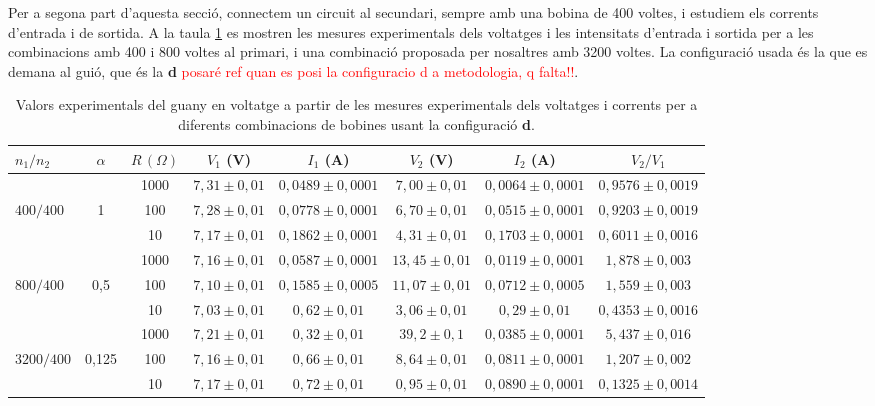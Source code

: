 \documentclass[a4paper,10.5pt]{report}
\begin{document}
Per a segona part d'aquesta secció, connectem un circuit al secundari, sempre amb una bobina de 400 voltes, i estudiem els corrents d’entrada i de sortida. A la taula \ref{tab:4.4} es mostren les mesures experimentals dels voltatges i les intensitats d'entrada i sortida per a les combinacions amb 400 i 800 voltes al primari, i una combinació proposada per nosaltres amb 3200 voltes. La configuració usada és la que es demana al guió, que és la \textbf{d} \textcolor{red}{posaré ref quan es posi la configuracio d a metodologia, q falta!!}. 

\begin{table}[H]
	\centering
	\renewcommand{\arraystretch}{1.2}
	\caption{Valors experimentals del guany en voltatge a partir de les mesures experimentals dels voltatges i corrents per a diferents combinacions de bobines usant la configuració \textbf{d}.}
	\begin{tabular}{lccccccc}
		\toprule
		$n_1/n_2$ & $\alpha$ & $R\,(\Omega)$ & $V_1$ (V) & $I_1$ (A) & $V_2$ (V) & $I_2$ (A) & $V_2/V_1$ \\
		\midrule
		& & 1000 & $7{,}31 \pm 0{,}01$ & $0{,}0489 \pm 0{,}0001$ & $7{,}00 \pm 0{,}01$ & $0{,}0064 \pm 0{,}0001$ & $0{,}9576 \pm 0{,}0019$ \\
		$400/400$ & 1 & 100  & $7{,}28 \pm 0{,}01$ & $0{,}0778 \pm 0{,}0001$ & $6{,}70 \pm 0{,}01$ & $0{,}0515 \pm 0{,}0001$ & $0{,}9203 \pm 0{,}0019$  \\
		& & 10   & $7{,}17 \pm 0{,}01$ & $0{,}1862 \pm 0{,}0001$ & $4{,}31 \pm 0{,}01$ & $0{,}1703 \pm 0{,}0001$ & $0{,}6011 \pm 0{,}0016$\\
		\midrule
		& & 1000 & $7{,}16 \pm 0{,}01$ & $0{,}0587 \pm 0{,}0001$ & $13{,}45 \pm 0{,}01$ & $0{,}0119 \pm 0{,}0001$ & $1{,}878 \pm 0{,}003$  \\
		$800/400$ & 0{,}5 & 100  & $7{,}10 \pm 0{,}01$ & $0{,}1585 \pm 0{,}0005$ & $11{,}07 \pm 0{,}01$ & $0{,}0712 \pm 0{,}0005$ & $1{,}559 \pm 0{,}003$ \\
		& & 10   & $7{,}03 \pm 0{,}01$ & $0{,}62 \pm 0{,}01$ & $3{,}06 \pm 0{,}01$ & $0{,}29 \pm 0{,}01$ & $0{,}4353 \pm 0{,}0016$ \\
		\midrule
		& & 1000 & $7{,}21 \pm 0{,}01$ & $0{,}32 \pm 0{,}01$ & $39{,}2 \pm 0{,}1$ & $0{,}0385 \pm 0{,}0001$ & $5{,}437 \pm 0{,}016$ \\
		$3200/400$ & 0{,}125 & 100  & $7{,}16 \pm 0{,}01$ & $0{,}66 \pm 0{,}01$ & $8{,}64 \pm 0{,}01$ & $0{,}0811 \pm 0{,}0001$ & $1{,}207 \pm 0{,}002$  \\
		& & 10   & $7{,}17 \pm 0{,}01$ & $0{,}72 \pm 0{,}01$ & $0{,}95 \pm 0{,}01$ & $0{,}0890 \pm 0{,}0001$ & $0{,}1325 \pm 0{,}0014$ \\
		\bottomrule
	\end{tabular}
	\label{tab:4.4}
\end{table}
\end{document}

